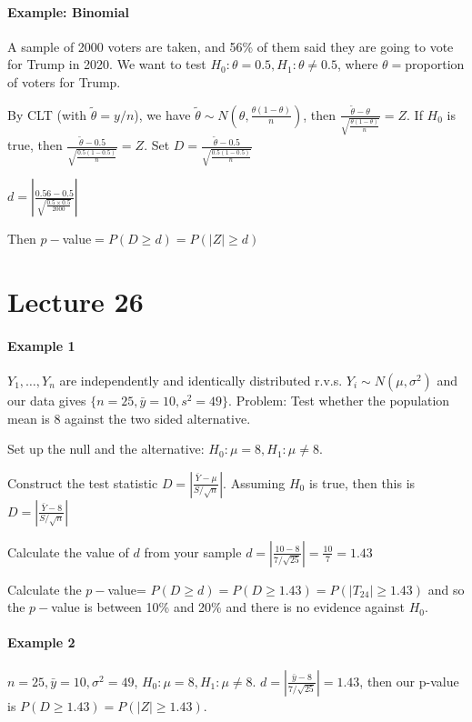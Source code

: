 \documentclass[10pt,letter]{article}
\theoremstyle{plain}
\theoremstyle{definition}
\begin{document}
\paragraph{Example: Binomial}
A sample of 2000 voters are taken, and 56\% of them said they are going to vote for Trump in 2020. We want to test $H_0:\theta=0.5,H_1:\theta\neq0.5$, where $\theta=$proportion of voters for Trump. 
\begin{steps}
    \item By CLT (with $\tilde{\theta}=y/n$), we have $\tilde{\theta}\sim N\left(\theta,\frac{\theta(1-\theta)}{n}\right)$, then $\frac{\tilde{\theta}-\theta}{\sqrt{\frac{\theta(1-\theta)}{n}}}=Z$. If $H_0$ is true, then $\frac{\tilde{\theta}-0.5}{\sqrt{\frac{0.5(1-0.5)}{n}}}=Z$. Set $D=\frac{\tilde{\theta}-0.5}{\sqrt{\frac{0.5(1-0.5)}{n}}}$ 
    \item $d=\left|\frac{0.56-0.5}{\sqrt{\frac{0.5\times0.5}{2000}}}\right|$ 
    \item Then $p-$value$=P(D\geq d)=P(|Z|\geq d)$
\end{steps}


\section*{Lecture 26}
\paragraph{Example 1}
$Y_1,\ldots,Y_n$ are independently and identically distributed r.v.s. $Y_i\sim N(\mu,\sigma^2)$ and our data gives $\{n=25,\bar{y}=10,s^2=49\}$. Problem: Test whether the population mean is 8 against the two sided alternative. 
\begin{steps}
    \item Set up the null and the alternative: $H_0:\mu=8,H_1:\mu\neq8$. 
    \item Construct the test statistic $D=\left|\frac{\bar{Y}-\mu}{S/\sqrt{n}}\right|$. Assuming $H_0$ is true, then this is $D=\left|\frac{\bar{Y}-8}{S/\sqrt{n}}\right|$ 
    \item Calculate the value of $d$ from your sample $d=\left|\frac{10-8}{7/\sqrt{25}}\right|=\frac{10}{7}=1.43$ 
    \item Calculate the $p-$value= $P(D\geq d)=P(D\geq1.43)=P(|T_{24}|\geq1.43)$ and so the $p-$value is between 10\% and 20\% and there is no evidence against $H_0$. 
\end{steps}

\paragraph{Example 2}
$n=25,\bar{y}=10, \sigma^2=49$, $H_0:\mu=8,H_1:\mu\neq8$. $d=\left|\frac{\bar{y}-8}{7/\sqrt{25}}\right|=1.43$, then our p-value is $P(D\geq1.43)=P(|Z|\geq1.43)$. 
\end{document}

